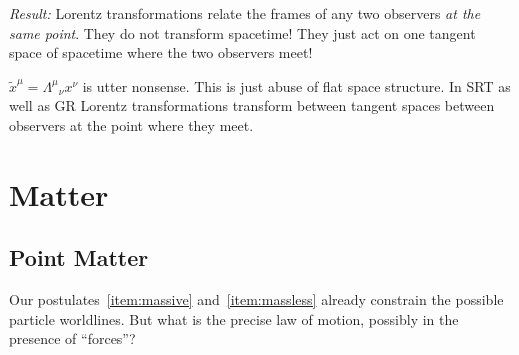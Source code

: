 \documentclass[11pt, a4paper, twocolumn]{article} %
\begin{document}
    \textit{Result:} Lorentz transformations relate the frames of any two observers
    \textit{at the same point}.
    They do not transform spacetime! They just act on one tangent space of spacetime
    where the two observers meet!
    \begin{note}
        $\tilde{x}^\mu = \Lambda^\mu{}_\nu x^\nu$ is utter nonsense.
        This is just abuse of flat space structure.
        In SRT as well as GR Lorentz transformations transform between tangent spaces
        between observers at the point where they meet.
    \end{note}

    \section{Matter}
    \subsection{Point Matter}
    Our postulates~\ref{item:massive} and~\ref{item:massless} already constrain the possible particle worldlines.
    But what is the precise law of motion, possibly in the presence of ``forces''?
\end{document}

